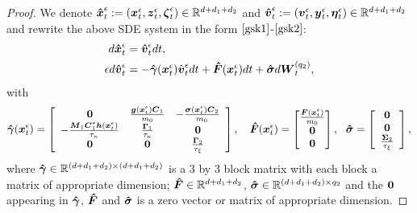 \begin{proof}
We denote $\boldsymbol{\hat{x}}^\epsilon_{t} := (\boldsymbol{x}^\epsilon_{t}, \boldsymbol{z}^\epsilon_{t}, \boldsymbol{\zeta}^\epsilon_{t}) \in \mathbb{R}^{d+d_1+d_2}$ and $\boldsymbol{\hat{v}}^\epsilon_{t} := (\boldsymbol{v}^\epsilon_{t}, \boldsymbol{y}^\epsilon_{t}, \boldsymbol{\eta}^\epsilon_{t}) \in \mathbb{R}^{d+d_1+d_2} $ and rewrite the above SDE system in the form  $\eqref{gsk1}$-$\eqref{gsk2}$:
\begin{align}
d\boldsymbol{\hat{x}}^{\epsilon}_{t} &= \boldsymbol{\hat{v}}^{\epsilon}_{t} dt \label{gen_nsk1}, \\
\epsilon d\boldsymbol{\hat{v}}^\epsilon_{t} &= - \boldsymbol{\hat{\gamma}}(\boldsymbol{x}^\epsilon_{t}) \hat{\boldsymbol{v}}^\epsilon_{t} dt + \boldsymbol{\hat{F}}(\boldsymbol{x}^\epsilon_{t})dt + \boldsymbol{\hat{\sigma}} d\boldsymbol{W}^{(q_2)}_{t}, \label{gen_nsk2}
\end{align}
with \begin{equation}\boldsymbol{\hat{\gamma}}(\boldsymbol{x}^\epsilon_{t}) = \left[ \begin{array}{ccc}
\boldsymbol{0} & \frac{\boldsymbol{g}(\boldsymbol{x}^\epsilon_{t}) \boldsymbol{C}_1}{m_{0}} & -\frac{\boldsymbol{\sigma}(\boldsymbol{x}^\epsilon_{t}) \boldsymbol{C}_2}{m_{0}}   \\
-\frac{\boldsymbol{M}_1 \boldsymbol{C}_1^* \boldsymbol{h}(\boldsymbol{x}^\epsilon_{t}) }{\tau_{\kappa}}  & \frac{\boldsymbol{\Gamma}_1}{\tau_{\kappa}} & \boldsymbol{0}  \\ 
\boldsymbol{0}  & \boldsymbol{0}  & \frac{\boldsymbol{\Gamma}_2}{\tau_{\xi}} \end{array} \right], \ \ \ \boldsymbol{\hat{F}}(\boldsymbol{x}^\epsilon_{t}) = \begin{bmatrix}
         \frac{\boldsymbol{F}(\boldsymbol{x}^\epsilon_{t})}{m_{0}} \\
         \boldsymbol{0}  \\
         \boldsymbol{0}  \\
        \end{bmatrix}, \ \  \boldsymbol{\hat{\sigma}}= 
         \left[ \begin{array}{c}
   \boldsymbol{0}    \\
 \boldsymbol{0}  \\ 
\frac{\boldsymbol{\Sigma}_2}{\tau_{\xi}}    \end{array} \right], \end{equation}
where $\boldsymbol{\hat{\gamma}} \in \mathbb{R}^{(d+d_1+d_2) \times (d+d_1+d_2)}$ is a 3 by 3 block matrix with each block a matrix of appropriate dimension; $\boldsymbol{\hat{F}} \in \mathbb{R}^{d+d_1+d_2}$, $\boldsymbol{\hat{\sigma}} \in \mathbb{R}^{(d+d_1+d_2)\times q_2}$ and the $\boldsymbol{0}$ appearing in $\boldsymbol{\hat{\gamma}}$, $\boldsymbol{\hat{F}}$ and $\boldsymbol{\hat{\sigma}}$  is a zero vector or matrix of appropriate dimension.


\end{proof}
